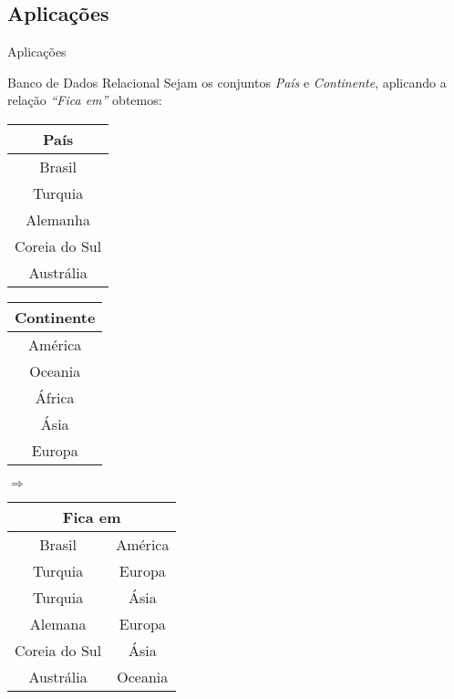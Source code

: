 \def\mysection{Aplicações}
\subsection{\mysection}

\begin{frame}{\mysection}
\footnotesize
  \begin{block}{Banco de Dados Relacional}
    Sejam os conjuntos \emph{País} e \emph{Continente}, aplicando a
    relação \emph{``Fica em''} obtemos: \\
    \bigskip
    \begin{minipage}[h]{.25\linewidth}
      \begin{tabular}[h]{|c|}\hline
        \bf País \\\hline
        Brasil\\
        Turquia\\
        Alemanha\\
        Coreia do Sul\\
        Austrália\\\hline
      \end{tabular}
    \end{minipage}
    \begin{minipage}[h]{.25\linewidth}
    \begin{tabular}[h]{|c|}\hline
      \bf Continente\\\hline
      América\\
      Oceania\\
      África\\
      Ásia\\
      Europa\\\hline
    \end{tabular}
    \end{minipage}$\Rightarrow$
    \begin{minipage}[h]{.35\linewidth}
      \begin{tabular}[h]{|c|c|}\hline
        \multicolumn{2}{|c|}{\bf Fica em} \\\hline
        Brasil & América\\
        Turquia & Europa\\
        Turquia & Ásia\\
        Alemana & Europa\\
        Coreia do Sul & Ásia\\
        Austrália & Oceania\\\hline
      \end{tabular}
    \end{minipage}
  \end{block}

\end{frame}

